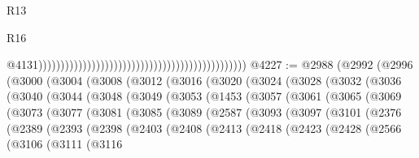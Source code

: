 \begin{lexlean}{R13}
\begin{lexlean}{R16}
\begin{coremodule}
{{{{{{{{{{{{{{{{{{{{{{{{{{{{{{{{{{{{{{{{{{{{{{{{{{{{{{{{{{{{{{{{{{{{{{{{{{{{{{{{{{{{{{{{{{{{{{{{{{{{{{{{{{{{{{{{{                                                                                                  @4131)))))))))))))))))))))))))))))))))))))))))))))))
@4227 := @2988
    (@2992
      (@2996
        (@3000
          (@3004
            (@3008
              (@3012
                (@3016
                  (@3020
                    (@3024
                      (@3028
                        (@3032
                          (@3036
                            (@3040
                              (@3044
                                (@3048
                                  (@3049
                                    (@3053
                                      (@1453
                                        (@3057
                                          (@3061
                                            (@3065
                                              (@3069
                                                (@3073
                                                  (@3077
                                                    (@3081
                                                      (@3085
                                                        (@3089
                                                          (@2587
                                                            (@3093
                                                              (@3097
                                                                (@3101
                                                                  (@2376
                                                                    (@2389
                                                                      (@2393
                                                                        (@2398
                                                                          (@2403
                                                                            (@2408
                                                                              (@2413
                                                                                (@2418
                                                                                  (@2423
                                                                                    (@2428
                                                                                      (@2566
                                                                                        (@3106
                                                                                          (@3111
                                                                                            (@3116
}}}}}}}}}}}}}}}}}}}}}}}}}}}}}}}}}}}}}}}}}}}}}}}}}}}}}}}}}}}}}}}}}}}}}}}}}}}}}}}}}}}}}}}}}}}}}}}}}}}}}}}}}}}}}}}}}
\end{coremodule}
\end{lexlean}
\end{lexlean}
